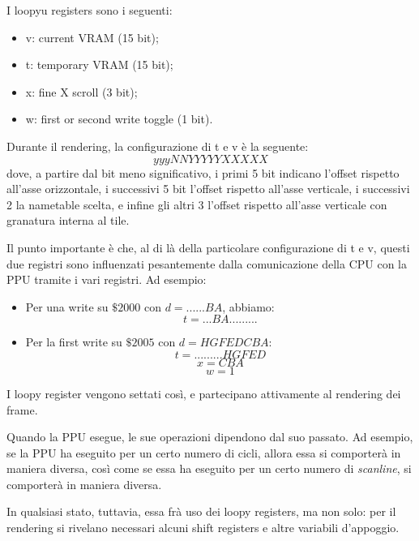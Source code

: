 \documentclass[11pt]{article}
\begin{document}
I loopyu registers sono i seguenti:
\begin{itemize}
\item{
v: current VRAM (15 bit);
}
\item{
t: temporary VRAM (15 bit);
}
\item{
x: fine X scroll (3 bit);
}
\item{
w: first or second write toggle (1 bit).
}
\end{itemize}
Durante il rendering, la configurazione di t e v è la seguente:
\[
	yyyNNYYYYYXXXXX
\]
dove, a partire dal bit meno significativo, i primi 5 bit indicano l'offset rispetto all'asse orizzontale, i successivi 5 bit l'offset rispetto all'asse verticale, i successivi 2 la nametable scelta, e infine gli altri 3 l'offset rispetto all'asse verticale con granatura interna al tile.

Il punto importante è che, al di là della particolare configurazione di t e v, questi due registri sono influenzati pesantemente dalla comunicazione della CPU con la PPU tramite i vari registri. Ad esempio:
\begin{itemize}
	\item{
		Per una write su $\$2000$ con $d=......BA$, abbiamo:
		\[
			t = ...BA.........
		\]
	}
	\item{
		Per la first write su $\$2005$ con $d=HGFEDCBA$:
		\[
			t = .........HGFED
		\]
		\[
			x = CBA
		\]
		\[
			w = 1
		\]
	}
\end{itemize}
I loopy register vengono settati così, e partecipano attivamente al rendering dei frame.

Quando la PPU esegue, le sue operazioni dipendono dal suo passato. Ad esempio, se la PPU ha eseguito per un certo numero di cicli, allora essa si comporterà in maniera diversa, così come se essa ha eseguito per un certo numero di \emph{scanline}, si comporterà in maniera diversa.

In qualsiasi stato, tuttavia, essa frà uso dei loopy registers, ma non solo: per il rendering si rivelano necessari alcuni shift registers e altre variabili d'appoggio.
\end{document}
